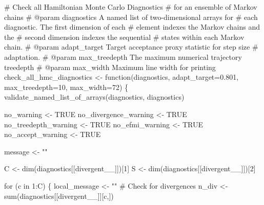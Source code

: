 \documentclass[
  letterpaper,
  DIV=11,
  numbers=noendperiod]{scrartcl}
\newenvironment{Shaded}{\begin{snugshade}}{\end{snugshade}}
\newcommand{\BuiltInTok}[1]{\textcolor[rgb]{0.00,0.23,0.31}{#1}}
\newcommand{\CommentTok}[1]{\textcolor[rgb]{0.37,0.37,0.37}{#1}}
\newcommand{\ControlFlowTok}[1]{\textcolor[rgb]{0.00,0.23,0.31}{#1}}
\newcommand{\DecValTok}[1]{\textcolor[rgb]{0.68,0.00,0.00}{#1}}
\newcommand{\FloatTok}[1]{\textcolor[rgb]{0.68,0.00,0.00}{#1}}
\newcommand{\KeywordTok}[1]{\textcolor[rgb]{0.00,0.23,0.31}{#1}}
\newcommand{\NormalTok}[1]{\textcolor[rgb]{0.00,0.23,0.31}{#1}}
\newcommand{\OperatorTok}[1]{\textcolor[rgb]{0.37,0.37,0.37}{#1}}
\newcommand{\StringTok}[1]{\textcolor[rgb]{0.13,0.47,0.30}{#1}}
\begin{document}
\begin{Shaded}
\begin{Highlighting}[]
\CommentTok{\# Check all Hamiltonian Monte Carlo Diagnostics }
\CommentTok{\# for an ensemble of Markov chains}
\CommentTok{\# @param diagnostics A named list of two{-}dimensional arrays for }
\CommentTok{\#                    each diagnostic.  The first dimension of each}
\CommentTok{\#                    element indexes the Markov chains and the }
\CommentTok{\#                    second dimension indexes the sequential }
\CommentTok{\#                    states within each Markov chain.}
\CommentTok{\# @param adapt\_target Target acceptance proxy statistic for step size }
\CommentTok{\#                     adaptation.}
\CommentTok{\# @param max\_treedepth The maximum numerical trajectory treedepth}
\CommentTok{\# @param max\_width Maximum line width for printing}
\NormalTok{check\_all\_hmc\_diagnostics }\OperatorTok{\textless{}{-}}\NormalTok{ function(diagnostics,}
\NormalTok{                                      adapt\_target}\OperatorTok{=}\FloatTok{0.801}\NormalTok{,}
\NormalTok{                                      max\_treedepth}\OperatorTok{=}\DecValTok{10}\NormalTok{,}
\NormalTok{                                      max\_width}\OperatorTok{=}\DecValTok{72}\NormalTok{) \{}
\NormalTok{  validate\_named\_list\_of\_arrays(diagnostics, }\StringTok{\textquotesingle{}diagnostics\textquotesingle{}}\NormalTok{)}
  
\NormalTok{  no\_warning }\OperatorTok{\textless{}{-}}\NormalTok{ TRUE}
\NormalTok{  no\_divergence\_warning }\OperatorTok{\textless{}{-}}\NormalTok{ TRUE}
\NormalTok{  no\_treedepth\_warning }\OperatorTok{\textless{}{-}}\NormalTok{ TRUE}
\NormalTok{  no\_efmi\_warning }\OperatorTok{\textless{}{-}}\NormalTok{ TRUE}
\NormalTok{  no\_accept\_warning }\OperatorTok{\textless{}{-}}\NormalTok{ TRUE}
  
\NormalTok{  message }\OperatorTok{\textless{}{-}} \StringTok{""}
  
\NormalTok{  C }\OperatorTok{\textless{}{-}}\NormalTok{ dim(diagnostics[[}\StringTok{\textquotesingle{}divergent\_\_\textquotesingle{}}\NormalTok{]])[}\DecValTok{1}\NormalTok{]}
\NormalTok{  S }\OperatorTok{\textless{}{-}}\NormalTok{ dim(diagnostics[[}\StringTok{\textquotesingle{}divergent\_\_\textquotesingle{}}\NormalTok{]])[}\DecValTok{2}\NormalTok{]}
  
  \ControlFlowTok{for}\NormalTok{ (c }\KeywordTok{in} \DecValTok{1}\NormalTok{:C) \{}
\NormalTok{    local\_message }\OperatorTok{\textless{}{-}} \StringTok{""}
    \CommentTok{\# Check for divergences}
\NormalTok{    n\_div }\OperatorTok{\textless{}{-}} \BuiltInTok{sum}\NormalTok{(diagnostics[[}\StringTok{\textquotesingle{}divergent\_\_\textquotesingle{}}\NormalTok{]][c,])}
    

\end{Highlighting}
\end{Shaded}
\end{document}
